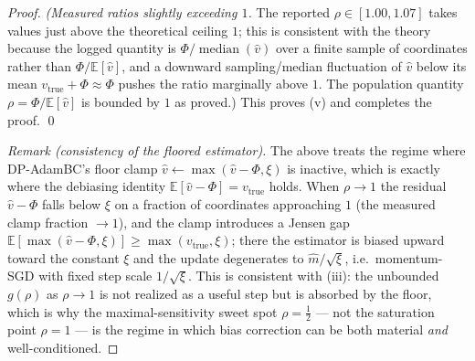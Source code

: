 \begin{proof}
\smallskip
\noindent\emph{(Measured ratios slightly exceeding $1$.} The reported $\rho\in[1.00,1.07]$ takes values just above the theoretical ceiling $1$; this is consistent with the theory because the logged quantity is $\Phi/\operatorname{median}(\hat v)$ over a finite sample of coordinates rather than $\Phi/\mathbb E[\hat v]$, and a downward sampling/median fluctuation of $\hat v$ below its mean $v_{\mathrm{true}}+\Phi\approx\Phi$ pushes the ratio marginally above $1$. The population quantity $\rho=\Phi/\mathbb E[\hat v]$ is bounded by $1$ as proved.) This proves (v) and completes the proof. \qed

\medskip
\noindent\emph{Remark (consistency of the floored estimator).} The above treats the regime where DP-AdamBC's floor clamp $\hat v\leftarrow\max(\hat v-\Phi,\xi)$ is inactive, which is exactly where the debiasing identity $\mathbb E[\hat v-\Phi]=v_{\mathrm{true}}$ holds. When $\rho\to1$ the residual $\hat v-\Phi$ falls below $\xi$ on a fraction of coordinates approaching $1$ (the measured clamp fraction $\to1$), and the clamp introduces a Jensen gap $\mathbb E[\max(\hat v-\Phi,\xi)]\ge\max(v_{\mathrm{true}},\xi)$; there the estimator is biased upward toward the constant $\xi$ and the update degenerates to $\hat m/\sqrt{\xi}$, i.e.\ momentum-SGD with fixed step scale $1/\sqrt{\xi}$. This is consistent with (iii): the unbounded $g(\rho)$ as $\rho\to1$ is not realized as a useful step but is absorbed by the floor, which is why the maximal-sensitivity sweet spot $\rho=\tfrac12$ --- not the saturation point $\rho=1$ --- is the regime in which bias correction can be both material \emph{and} well-conditioned.


\end{proof}
